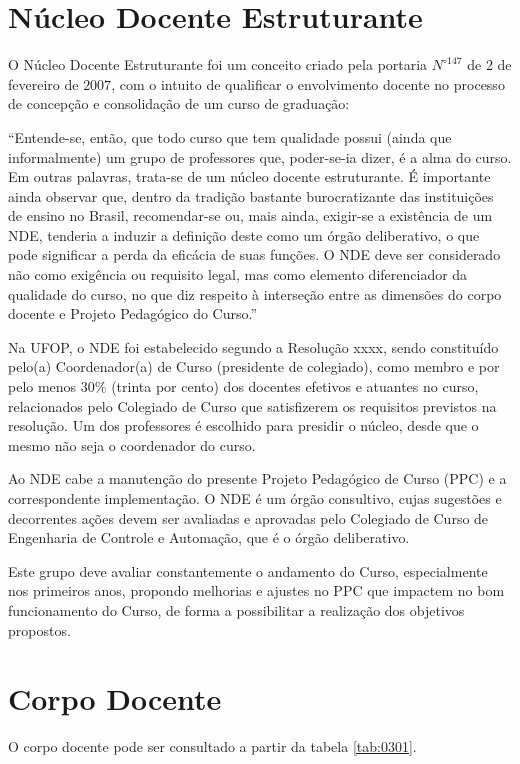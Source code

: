 \section{Núcleo Docente Estruturante}

O Núcleo Docente Estruturante foi um conceito criado pela portaria $N^{\circ 147}$ de $2$ de fevereiro de $2007$, com o intuito de qualificar o envolvimento docente no processo de concepção e consolidação de um curso de graduação:
\begin{citacao}
	``Entende-se, então, que todo curso que tem qualidade possui (ainda que informalmente) um grupo de professores que, poder-se-ia  dizer,  é a alma do curso. Em  outras palavras, trata-se de um núcleo docente estruturante.	É importante ainda observar que, dentro da tradição bastante  burocratizante  das instituições de ensino no Brasil, recomendar-se ou, mais ainda, exigir-se a existência de um NDE, tenderia a induzir a definição deste como um 
	órgão deliberativo, o que pode significar a perda da eficácia de suas funções. O NDE  deve ser considerado não como  exigência ou requisito legal, mas como elemento diferenciador da qualidade do curso, no que diz respeito à interseção entre as dimensões do corpo docente e Projeto Pedagógico do Curso.''
\end{citacao}

Na UFOP, o NDE foi estabelecido segundo a Resolução xxxx, sendo constituído pelo(a) Coordenador(a) de Curso (presidente de colegiado), como membro e por pelo menos $30\%$ (trinta por cento) dos docentes efetivos e atuantes no curso, relacionados pelo Colegiado de Curso que satisfizerem os requisitos previstos na resolução. Um dos professores é escolhido para presidir o núcleo, desde que o mesmo não seja o coordenador do curso.
 
Ao NDE cabe a manutenção do presente Projeto Pedagógico de Curso (PPC) e a correspondente implementação. O NDE é um órgão consultivo, cujas sugestões e decorrentes ações devem ser avaliadas e aprovadas pelo Colegiado de Curso de Engenharia de Controle e Automação, que é o órgão deliberativo. 

Este grupo deve avaliar constantemente o andamento do Curso, especialmente nos primeiros anos, propondo melhorias e ajustes no PPC que impactem no bom funcionamento do Curso, de forma a possibilitar a realização dos objetivos propostos.

\section{Corpo Docente}
O corpo docente pode ser consultado a partir da tabela \ref{tab:0301}.


